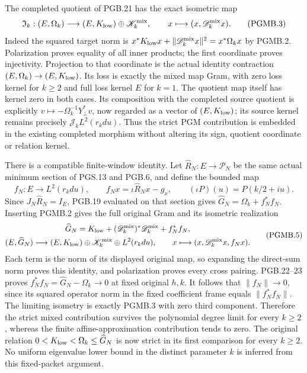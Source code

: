 \documentclass[11pt,a4paper]{article}
\theoremstyle{definition}
\begin{document}
The completed quotient of PGB.21 has the exact isometric map
\[
 \mathfrak I_k:(E,\Omega_k)\longrightarrow
       (E,K_{\rm low})\oplus\mathscr K_k^{\rm mix},
 \qquad x\longmapsto(x,\mathscr D_k^{\rm mix}x).
 \tag{PGMB.3}\label{eq:pgmb-completed-isometry}
\]
Indeed the squared target norm is
$x^*K_{\rm low}x+\|\mathscr D_k^{\rm mix}x\|^2
=x^*\Omega_kx$ by PGMB.2. Polarization proves equality of
all inner products; the first coordinate proves injectivity.
Projection to that coordinate is the actual identity contraction
$(E,\Omega_k)\to(E,K_{\rm low})$. Its loss is exactly the
mixed map Gram, with zero loss kernel for $k\geq2$ and full
loss kernel $E$ for $k=1$. The quotient map itself has kernel
zero in both cases. Its composition with the completed source
quotient is explicitly
$v\mapsto-\Omega_k^{-1}Y_\perp^*v$, now regarded as a vector
of $(E,K_{\rm low})$; its source kernel remains precisely
$\mathscr J_kL^2(r_kdu)$. Thus the strict PGM contribution is
embedded in the existing completed morphism without altering
its sign, quotient coordinate or relation kernel.

There is a compatible finite-window identity. Let
$\widehat R_N:E\to\mathcal P_N$ be the same actual minimum
section of PGS.13 and PGB.6, and define the bounded map
\[
 f_N:E\longrightarrow L^2(r_kdu),\qquad
 f_Nx=\iota\widehat R_Nx-g_x,\qquad
 (\iota P)(u)=P(k/2+iu).
 \tag{PGMB.4}\label{eq:pgmb-finite-tail}
\]
Since $J_N\widehat R_N=I_E$, PGB.19 evaluated on that section
gives $\widehat G_N=\Omega_k+f_N^*f_N$. Inserting PGMB.2
gives the full original Gram and its isometric realization
\[
 \begin{gathered}
 \widehat G_N=K_{\rm low}
       +(\mathscr D_k^{\rm mix})^*\mathscr D_k^{\rm mix}+f_N^*f_N,\\
 (E,\widehat G_N)\longrightarrow
 (E,K_{\rm low})\oplus\mathscr K_k^{\rm mix}\oplus L^2(r_kdu),
 \qquad x\longmapsto(x,\mathscr D_k^{\rm mix}x,f_Nx).
 \end{gathered}
 \tag{PGMB.5}\label{eq:pgmb-three-term-isometry}
\]
Each term is the norm of its displayed original map, so expanding
the direct-sum norm proves this identity, and polarization
proves every cross pairing. PGB.22--23 proves
$f_N^*f_N=\widehat G_N-\Omega_k\to0$ at fixed original $h,k$.
It follows that $\|f_N\|\to0$, since its squared operator norm
in the fixed coefficient frame equals $\|f_N^*f_N\|$.
The limiting isometry is exactly PGMB.3 with zero third
component. Therefore the strict mixed contribution survives
the polynomial degree limit for every $k\geq2$, whereas the
finite affine-approximation contribution tends to zero.
The original relation $0<K_{\rm low}<\Omega_k\leq\widehat G_N$
is now strict in its first comparison for every $k\geq2$.
No uniform eigenvalue lower bound in the distinct parameter
$k$ is inferred from this fixed-packet argument.
\end{document}
